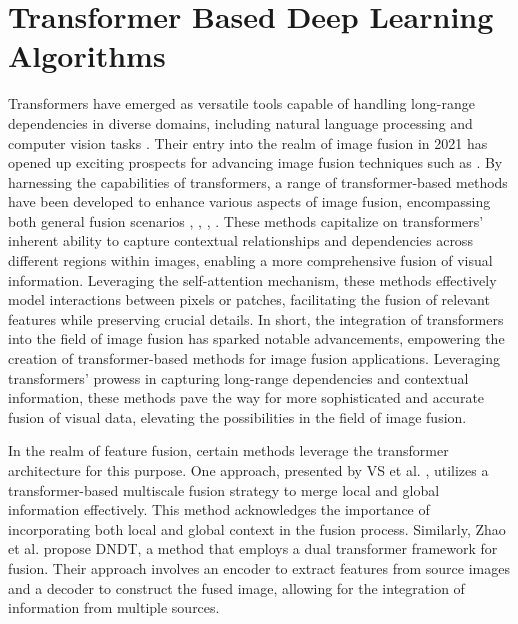 \section{Transformer Based Deep Learning Algorithms}

Transformers have emerged as versatile tools capable of handling long-range dependencies in diverse domains, including natural language processing and computer vision tasks \cite{dosovitskiy2020image, liu2021swin, liu2022mfst}. Their entry into the realm of image fusion in 2021 has opened up exciting prospects for advancing image fusion techniques such as \cite{zhao2021dndt, rao2023tgfuse, li2022cgtf, tang2022ydtr, wang2022swinfuse, yang2023dglt, tang2023tccfusion}. By harnessing the capabilities of transformers, a range of transformer-based methods have been developed to enhance various aspects of image fusion, encompassing both general fusion scenarios \cite{vs2022image}, \cite{fu2021ppt}, \cite{ma2022swinfusion}, \cite{qu2022transfuse}. These methods capitalize on transformers' inherent ability to capture contextual relationships and dependencies across different regions within images, enabling a more comprehensive fusion of visual information. Leveraging the self-attention mechanism, these methods effectively model interactions between pixels or patches, facilitating the fusion of relevant features while preserving crucial details. In short, the integration of transformers into the field of image fusion has sparked notable advancements, empowering the creation of transformer-based methods for image fusion applications. Leveraging transformers' prowess in capturing long-range dependencies and contextual information, these methods pave the way for more sophisticated and accurate fusion of visual data, elevating the possibilities in the field of image fusion.

In the realm of feature fusion, certain methods leverage the transformer architecture for this purpose. One approach, presented by VS et al. \cite{vs2022image}, utilizes a transformer-based multiscale fusion strategy to merge local and global information effectively. This method acknowledges the importance of incorporating both local and global context in the fusion process. Similarly, Zhao et al. \cite{zhao2021dndt} propose DNDT, a method that employs a dual transformer framework for fusion. Their approach involves an encoder to extract features from source images and a decoder to construct the fused image, allowing for the integration of information from multiple sources.

